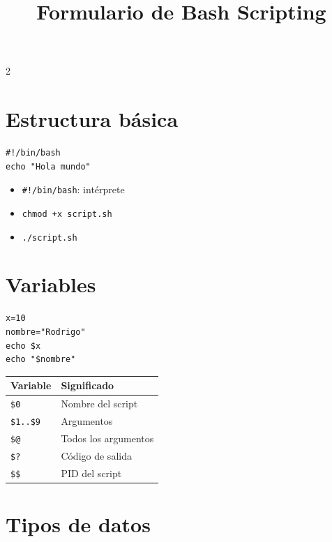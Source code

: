 \documentclass[10pt]{article}
\title{\textbf{Formulario de Bash Scripting}}
\author{}
\date{}
\begin{document}
\maketitle

\begin{multicols}{2}

\section*{Estructura básica}

\begin{lstlisting}
#!/bin/bash
echo "Hola mundo"
\end{lstlisting}

\begin{itemize}
\item \texttt{\#!/bin/bash}: intérprete
\item \texttt{chmod +x script.sh}
\item \texttt{./script.sh}
\end{itemize}

\section*{Variables}

\begin{lstlisting}
x=10
nombre="Rodrigo"
echo $x
echo "$nombre"
\end{lstlisting}

\begin{center}
\begin{tabular}{ll}
\toprule
Variable & Significado \\
\midrule
\texttt{\$0} & Nombre del script \\
\texttt{\$1..\$9} & Argumentos \\
\texttt{\$@} & Todos los argumentos \\
\texttt{\$?} & Código de salida \\
\texttt{\$\$} & PID del script \\
\bottomrule
\end{tabular}
\end{center}

\section*{Tipos de datos}


\end{multicols}
\end{document}
